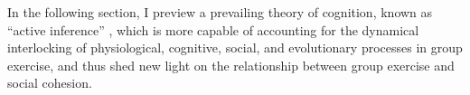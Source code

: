 \begin{CJK}{UTF8}{gbsn}
In the following section, I  preview a prevailing theory of cognition, known as ``active inference'' \citep{Friston2010}, which is more
capable of accounting for the dynamical interlocking of physiological, cognitive, social, and evolutionary processes in group exercise, and thus shed new light on the relationship between group exercise and social cohesion.








\end{CJK}
